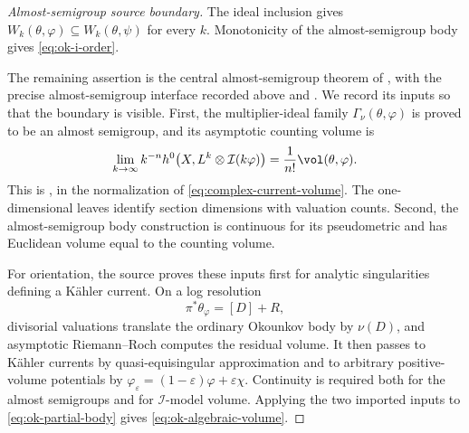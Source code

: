 \begin{proof}[Almost-semigroup source boundary]
The ideal inclusion gives
$W_k(\theta,\varphi)\subseteq W_k(\theta,\psi)$ for every $k$.
Monotonicity of the almost-semigroup body gives
\eqref{eq:ok-i-order}.

The remaining assertion is the central almost-semigroup theorem of
\cite[Section~5.1]{Xia21}, with the precise almost-semigroup interface
recorded above and \cite[Corollary~10.3.2]{XiaBook}.
We record its inputs so that the boundary is visible.
First, the multiplier-ideal family
$\Gamma_\nu(\theta,\varphi)$ is proved to be an almost semigroup, and its
asymptotic counting volume is
\[
 \lim_{k\to\infty}k^{-n}
 h^0\!\left(X,L^k\otimes\mathcal I(k\varphi)\right)
 =\frac1{n!}\vol(\theta,\varphi).
\]
This is \cite[Theorem~2.19]{Xia21}, in the normalization of
\eqref{eq:complex-current-volume}.  The one-dimensional leaves identify
section dimensions with valuation counts.  Second, the
almost-semigroup body construction is continuous for its pseudometric and
has Euclidean volume equal to the counting volume.

For orientation, the source proves these inputs first for analytic
singularities defining a K\"ahler current.  On a log resolution
\[
                   \pi^*\theta_\varphi=[D]+R,
\tag{55.6}\label{eq:ok-log-resolution}
\]
divisorial valuations translate the ordinary Okounkov body by
$\nu(D)$, and asymptotic Riemann--Roch computes the residual volume.  It
then passes to K\"ahler currents by quasi-equisingular approximation and
to arbitrary positive-volume potentials by
$\varphi_\varepsilon=(1-\varepsilon)\varphi+\varepsilon\chi$.
Continuity is required both for the almost semigroups and for
$\mathcal I$-model volume.  Applying the two imported inputs to
\eqref{eq:ok-partial-body} gives
\eqref{eq:ok-algebraic-volume}.
\end{proof}

